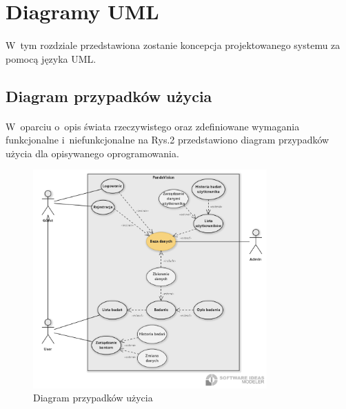 \documentclass[12pt, letterpaper]{article}
\begin{document}
\section{Diagramy UML}
\paragraph{}
W~tym rozdziale przedstawiona zostanie koncepcja projektowanego systemu za pomocą języka UML.		
		
		\subsection{Diagram przypadków użycia}
\paragraph{}		
W~oparciu o~opis świata rzeczywistego oraz zdefiniowane wymagania funkcjonalne i~niefunkcjonalne na Rys.2 przedstawiono diagram przypadków użycia dla opisywanego oprogramowania.

\begin{figure}[h]
  \centering
      \includegraphics[width=0.8\textwidth]{useCaseDiagram}
  \caption{Diagram przypadków użycia}
\end{figure}			
		
		

		\newpage		
		
\end{document}
